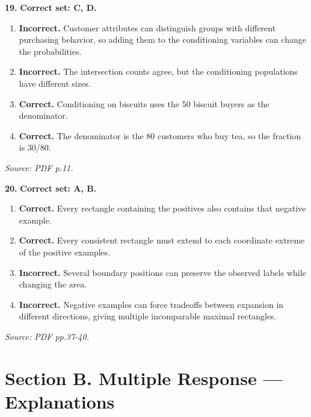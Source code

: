 \documentclass[11pt,a4paper]{article}
\begin{document}
\par\noindent\begin{minipage}{\linewidth}
\textbf{19.} \textbf{Correct set: C, D.}
\begin{enumerate}[label=(\Alph*),leftmargin=8mm,itemsep=2pt,topsep=2pt]
\item \textbf{Incorrect.} Customer attributes can distinguish groups with different purchasing behavior, so adding them to the conditioning variables can change the probabilities.
\item \textbf{Incorrect.} The intersection counts agree, but the conditioning populations have different sizes.
\item \textbf{Correct.} Conditioning on biscuits uses the 50 biscuit buyers as the denominator.
\item \textbf{Correct.} The denominator is the 80 customers who buy tea, so the fraction is 30/80.
\end{enumerate}
{\footnotesize\textit{Source: PDF p.11.}}

\end{minipage}\par\vspace{3mm}
\par\noindent\begin{minipage}{\linewidth}
\textbf{20.} \textbf{Correct set: A, B.}
\begin{enumerate}[label=(\Alph*),leftmargin=8mm,itemsep=2pt,topsep=2pt]
\item \textbf{Correct.} Every rectangle containing the positives also contains that negative example.
\item \textbf{Correct.} Every consistent rectangle must extend to each coordinate extreme of the positive examples.
\item \textbf{Incorrect.} Several boundary positions can preserve the observed labels while changing the area.
\item \textbf{Incorrect.} Negative examples can force tradeoffs between expansion in different directions, giving multiple incomparable maximal rectangles.
\end{enumerate}
{\footnotesize\textit{Source: PDF pp.37-40.}}

\end{minipage}\par\vspace{3mm}
\newpage\section*{Section B. Multiple Response --- Explanations}
\end{document}

